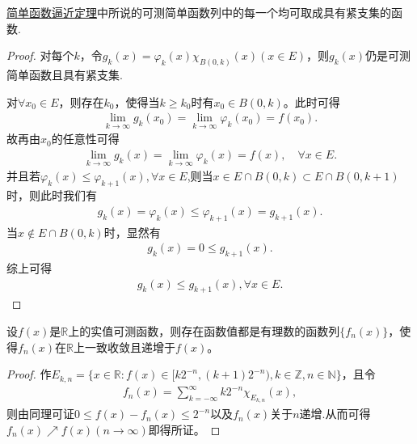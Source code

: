 \documentclass[../../main.tex]{subfiles}
\begin{document}
\begin{corollary}\label{corollary:简单函数逼近定理的加强形式}
\hyperref[theorem:简单函数逼近定理]{简单函数逼近定理}中所说的可测简单函数列中的每一个均可取成具有紧支集的函数.
\end{corollary}
\begin{proof}
对每个$k$，令$g_k(x) = \varphi_k(x)\chi_{B(0,k)}(x) (x \in E)$，则$g_k(x)$仍是可测简单函数且具有紧支集.

对$\forall x_0 \in E$，则存在$k_0$，使得当$k \geqslant k_0$时有$x_0 \in B(0,k)$。此时可得
\begin{align*}
\lim_{k \to \infty} g_k(x_0) = \lim_{k \to \infty} \varphi_k(x_0) = f(x_0).
\end{align*}
故再由$x_0$的任意性可得
\begin{align*}
\lim_{k \to \infty} g_k(x) = \lim_{k \to \infty} \varphi_k(x) = f(x),\quad \forall x\in E.
\end{align*} 
并且若$\varphi_k(x)\leqslant \varphi_{k+1}(x),\forall x\in E$,则当$x\in E\cap B(0,k) \subset E\cap B(0,k + 1)$时，则此时我们有
\begin{align*}
g_k(x) = \varphi_k(x) \leqslant \varphi_{k + 1}(x) = g_{k + 1}(x).
\end{align*}
当$x\notin E\cap B(0,k)$时，显然有
\begin{align*}
g_k(x) = 0 \leqslant g_{k + 1}(x).
\end{align*}
综上可得
\begin{align*}
g_k(x) \leqslant g_{k + 1}(x), \forall x\in E.
\end{align*} 
\end{proof}

\begin{theorem}
设$f(x)$是$\mathbb{R}$上的实值可测函数，则存在函数值都是有理数的函数列$\{f_n(x)\}$，使得$f_n(x)$在$\mathbb{R}$上一致收敛且递增于$f(x)$。
\end{theorem}
\begin{proof}
作$E_{k,n} = \{x \in \mathbb{R}: f(x) \in [k2^{-n}, (k + 1)2^{-n}), k \in \mathbb{Z}, n \in \mathbb{N}\}$，且令
\begin{align*}
f_n(x) = \sum_{k = -\infty}^{\infty} k2^{-n} \chi_{E_{k,n}}(x),
\end{align*}
则由同理可证$0 \leqslant f(x) - f_n(x) \leqslant 2^{-n}$以及$f_n(x)$关于$n$递增.从而可得$f_n(x) \nearrow f(x) (n \to \infty)$即得所证。 
\end{proof}
\end{document}
